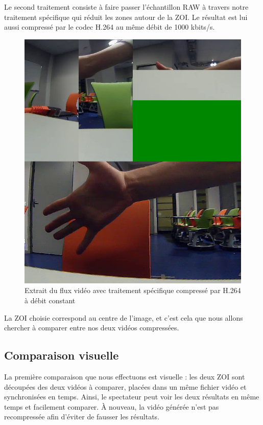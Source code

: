 \documentclass[11pt,a4paper]{article}
\begin{document}
\bigbreak
Le second traitement consiste à faire passer l'échantillon RAW à travers notre traitement spécifique qui réduit les zones autour de la ZOI.
Le résultat est lui aussi compressé par le codec H.264 au même débit de 1000 kbits/s.

\begin{figure}[H]
\begin{center}
\includegraphics[scale=0.25]{images/comparaison_flux2.png}
\end{center}
\caption{Extrait du flux vidéo avec traitement spécifique compressé par H.264 à débit constant}
\label{}
\end{figure}


\bigbreak
La ZOI choisie correspond au centre de l'image, et c'est cela que nous allons chercher à comparer entre nos deux vidéos compressées.

\subsection{Comparaison visuelle}
La première comparaison que nous effectuons est visuelle : les deux ZOI sont découpées des deux vidéos à comparer, placées dans un même fichier vidéo et synchronisées en temps.
Ainsi, le spectateur peut voir les deux résultats en même temps et facilement comparer.
À nouveau, la vidéo générée n'est pas recompressée afin d'éviter de fausser les résultats.
\end{document}

